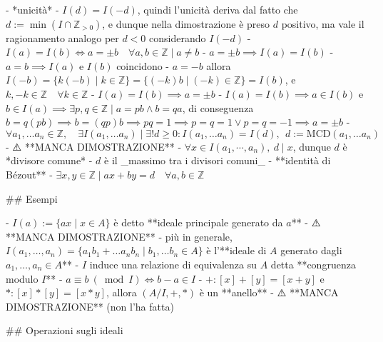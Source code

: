   - *unicità*
    - \( I(d)=I(-d)\), quindi l'unicità deriva dal fatto che $d:=\min(I \cap \mathbb{Z}_{\gt 0})$, e dunque nella dimostrazione è preso $d$ positivo, ma vale il ragionamento analogo per $d < 0$ considerando $I(-d)$
      - \( I(a)=I(b) \iff a=\pm b \quad \forall a, b \in \mathbb{Z} \mid a \neq b\)
        - \( a=\pm b \implies I(a)=I(b) \)
          - $a = b \implies I(a)$ e $I(b)$ coincidono
          - $a = -b$ allora $I(-b) = \{ k(-b) \mid k \in \mathbb{Z}\} = \{(-k)b \mid (-k) \in \mathbb{Z}\} = I(b)$, e $k, -k \in \mathbb{Z} \quad \forall k \in \mathbb{Z}$
        - $I(a) = I(b) \implies a = \pm b$
          - $I(a) = I(b) \implies a \in I(b)$ e $b \in I(a) \implies \exists p, q \in \mathbb{Z} \mid a = pb \wedge b = qa$, di conseguenza $b = q (pb) \implies b = (qp)b \implies pq = 1 \implies p = q = 1 \lor p = q = -1 \implies a = \pm b$
- \( \forall a_{1}, \ldots a_{n} \in \mathbb{Z}, \quad \exists I\left(a_{1}, \ldots a_{n}\right) \mid \exists ! d \geq 0  : I\left(a_{1}, \ldots a_{n}\right)=I(d),   \ \ d:=\textrm{MCD}(a_{1}, \ldots a_{n}) \)
    - ⚠️ **MANCA DIMOSTRAZIONE**
      - $\forall x \in I(a_1, \cdots, a_n), \ d \mid x$, dunque $d$ è *divisore comune*
      - $d$ è il _massimo tra i divisori comuni_
  - **identità di Bézout**
    - \( \exists x, y \in \mathbb{Z} \mid a x+b y=d \quad \forall a, b \in \mathbb{Z} \)

## Esempi

- $I(a) := \{ax \mid x \in A\}$ è detto **ideale principale generato da $a$**
    - ⚠️ **MANCA DIMOSTRAZIONE**
- più in generale, $I(a_1, \ldots, a_n) = \{ a_1b_1 + \ldots a_nb_n \mid b_1, \ldots b_n \in A\}$ è l'**ideale di $A$ generato dagli $a_1, \ldots, a_n \in A$**
  - $I$ induce una relazione di equivalenza su $A$ detta **congruenza modulo $I$**
    - $a \equiv b \ (\bmod I) \iff b - a \in I$
- $+: [x] + [y] = [x + y]$ e $*: [x] * [y] = [x * y]$, allora $(A/I, +, *)$ è un **anello**
  - ⚠️ **MANCA DIMOSTRAZIONE** (non l'ha fatta)
 
## Operazioni sugli ideali

